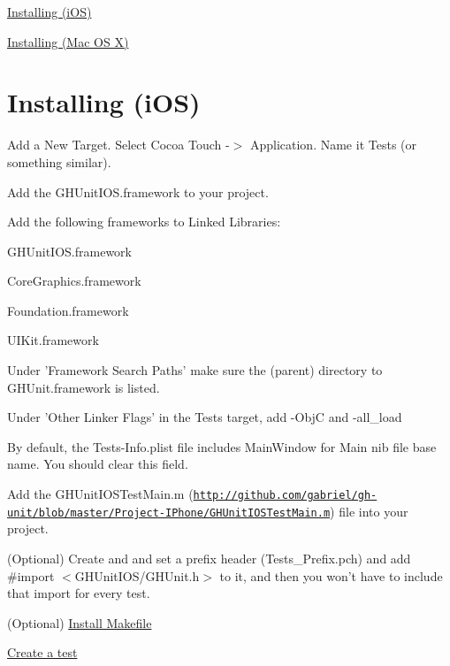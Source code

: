 
\begin{DoxyItemize}
\item \hyperlink{_installing_InstallingIOS}{\-Installing (i\-O\-S)}
\item \hyperlink{_installing_InstallMacOSX}{\-Installing (\-Mac \-O\-S \-X)}
\end{DoxyItemize}\hypertarget{_installing_InstallingIOS}{}\section{\-Installing (i\-O\-S)}\label{_installing_InstallingIOS}

\begin{DoxyItemize}
\item \-Add a {\ttfamily \-New \-Target}. \-Select {\ttfamily \-Cocoa \-Touch -\/$>$ \-Application}. \-Name it {\ttfamily \-Tests} (or something similar).
\item \-Add the {\ttfamily \-G\-H\-Unit\-I\-O\-S.\-framework} to your project.
\item \-Add the following frameworks to {\ttfamily \-Linked \-Libraries}\-:
\begin{DoxyItemize}
\item {\ttfamily \-G\-H\-Unit\-I\-O\-S.\-framework}
\item {\ttfamily \-Core\-Graphics.\-framework}
\item {\ttfamily \-Foundation.\-framework}
\item {\ttfamily \-U\-I\-Kit.\-framework}
\end{DoxyItemize}
\item \-Under '\-Framework \-Search \-Paths' make sure the (parent) directory to \-G\-H\-Unit.\-framework is listed.
\item \-Under '\-Other \-Linker \-Flags' in the {\ttfamily \-Tests} target, add {\ttfamily -\/\-Obj\-C} and {\ttfamily -\/all\-\_\-load}
\item \-By default, the \-Tests-\/\-Info.\-plist file includes {\ttfamily \-Main\-Window} for {\ttfamily \-Main nib file base name}. \-You should clear this field.
\item \-Add the \-G\-H\-Unit\-I\-O\-S\-Test\-Main.\-m (\href{http://github.com/gabriel/gh-unit/blob/master/Project-IPhone/GHUnitIOSTestMain.m}{\tt http\-://github.\-com/gabriel/gh-\/unit/blob/master/\-Project-\/\-I\-Phone/\-G\-H\-Unit\-I\-O\-S\-Test\-Main.\-m}) file into your project.
\item (\-Optional) \-Create and and set a prefix header ({\ttfamily \-Tests\-\_\-\-Prefix.\-pch}) and add {\ttfamily \#import $<$\-G\-H\-Unit\-I\-O\-S/\-G\-H\-Unit.\-h$>$} to it, and then you won't have to include that import for every test.
\item (\-Optional) \hyperlink{_command_line_Makefile}{\-Install \-Makefile}
\item \hyperlink{_examples}{\-Create a test}
\end{DoxyItemize}

